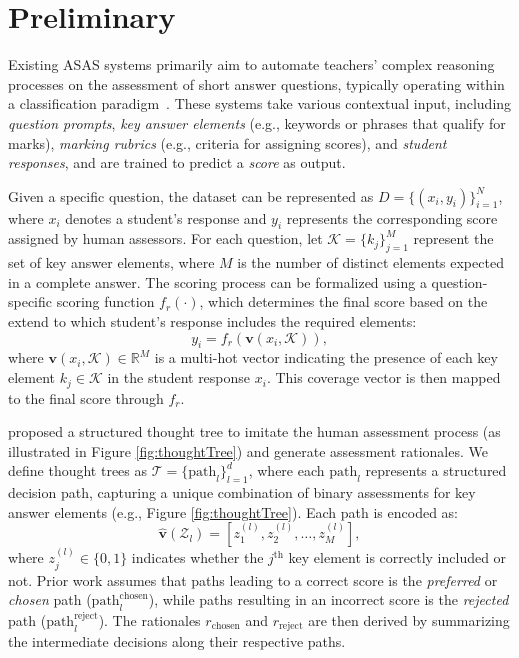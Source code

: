 
\section{Preliminary}
Existing ASAS systems primarily aim to automate teachers' complex reasoning processes on the assessment of short answer questions, typically operating within a classification paradigm~\cite{grading_classification,yue-aes-2017}. These systems take various contextual input, including \emph{question prompts}, \emph{key answer elements} (e.g., keywords or phrases that qualify for marks), \emph{marking rubrics} (e.g., criteria for assigning scores), and \emph{student responses}, and are trained to predict a \emph{score} as output.

Given a specific question, the dataset can be represented as \( D = \{(x_i, y_i)\}_{i=1}^{N} \), where \( x_i \) denotes a student's response and \( y_i \) represents the corresponding score assigned by human assessors. For each question, let \( \mathcal{K} = \{k_j\}_{j=1}^{M} \) represent the set of key answer elements, where \( M \) is the number of distinct elements expected in a complete answer. The scoring process can be formalized using a question-specific scoring function \( f_r(\cdot) \), which determines the final score based on the extend to which student's response includes the required elements:
\begin{equation}
y_i = f_r(\mathbf{v}(x_i, \mathcal{K})), \label{formula:assessment_problem_definenation}
\end{equation}
where \( \mathbf{v}(x_i, \mathcal{K}) \in \mathbb{R}^{M} \) is a multi-hot vector indicating the presence of each key element \( k_j \in \mathcal{K} \) in the student response \( x_i \).
This coverage vector is then mapped to the final score through \( f_r \).

\citet{li_emnlp2024} proposed a structured thought tree to imitate the human assessment process (as illustrated in Figure \ref{fig:thoughtTree}) %
and generate assessment rationales. We define thought trees as \( \mathcal{T}=\{\text{path}_l\}_{l=1}^{d} \), where each \( \text{path}_l \) represents a structured decision path, capturing a unique combination of binary assessments for key answer elements (e.g., Figure \ref{fig:thoughtTree}). Each path is encoded as:
\begin{equation}
    \hat{\mathbf{v}}(\mathcal{Z}_l) = [z_1^{(l)}, z_2^{(l)}, \dots, z_M^{(l)}],
\end{equation}
where \( z_j^{(l)} \in \{0,1\} \) indicates whether the \( j^\text{th} \) key element is correctly included or not. Prior work assumes that paths leading to a correct score is the \emph{preferred} or \emph{chosen} path ($\text{path}_l^{\text{chosen}}$), while paths resulting in an incorrect score is the \emph{rejected} path ($\text{path}_{l}^{\text{reject}}$). The rationales \( r_{\text{chosen}} \) and \( r_{\text{reject}} \) are then derived by summarizing the intermediate decisions along their respective paths. %

